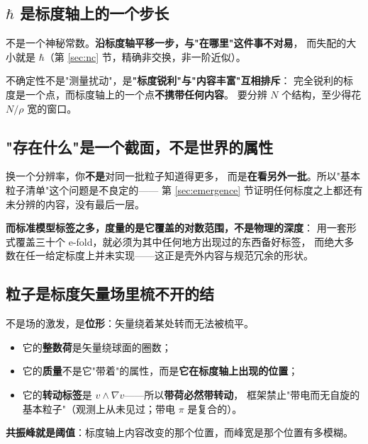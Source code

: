 \documentclass[11pt,a4paper]{article}
\theoremstyle{sudef}
\begin{document}
\subsection{$\hbar$ 是标度轴上的一个步长}

不是一个神秘常数。\textbf{沿标度轴平移一步，与"在哪里"这件事不对易}，
而失配的大小就是 $\hbar$（第 \ref{sec:nc} 节，精确非交换，非一阶近似）。

\begin{mdframed}[linecolor=axcol,linewidth=1pt,backgroundcolor=axcol!5]
不确定性不是"测量扰动"，是\textbf{"标度锐利"与"内容丰富"互相排斥}：
完全锐利的标度是一个点，而标度轴上的一个点\textbf{不携带任何内容}。
要分辨 $N$ 个结构，至少得花 $N/\rho$ 宽的窗口。
\end{mdframed}

\subsection{"存在什么"是一个截面，不是世界的属性}

换一个分辨率，你\textbf{不是}对同一批粒子知道得更多，
而是\textbf{在看另外一批}。所以"基本粒子清单"这个问题是不良定的——
第 \ref{sec:emergence} 节证明任何标度之上都还有未分辨的内容，没有最后一层。

\textbf{而标准模型标签之多，度量的是它覆盖的对数范围，不是物理的深度}：
用一套形式覆盖三十个 e-fold，就必须为其中任何地方出现过的东西备好标签，
而绝大多数在任一给定标度上并未实现——这正是壳外内容与规范冗余的形状。

\subsection{粒子是标度矢量场里梳不开的结}

不是场的激发，是\textbf{位形}：矢量绕着某处转而无法被梳平。

\begin{itemize}[leftmargin=1.6em,itemsep=2pt]
\item 它的\textbf{整数荷}是矢量绕球面的圈数；
\item 它的\textbf{质量}不是它"带着"的属性，而是\textbf{它在标度轴上出现的位置}；
\item 它的\textbf{转动标签}是 $v\wedge\nabla v$——所以\textbf{带荷必然带转动}，
      框架禁止"带电而无自旋的基本粒子"（观测上从未见过；带电 $\pi$ 是复合的）。
\end{itemize}

\textbf{共振峰就是阈值}：标度轴上内容改变的那个位置，而峰宽是那个位置有多模糊。
\end{document}
